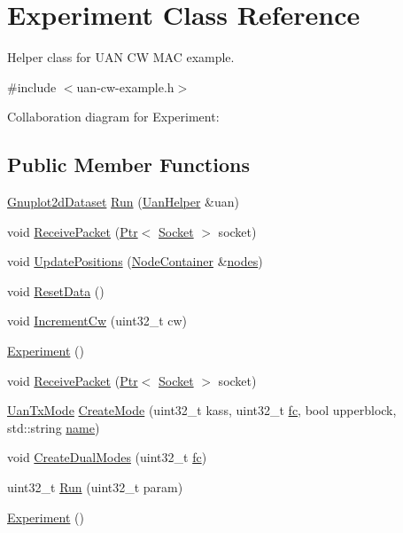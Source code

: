 \hypertarget{classExperiment}{}\section{Experiment Class Reference}
\label{classExperiment}


Helper class for U\+AN CW M\+AC example.  




{\ttfamily \#include $<$uan-\/cw-\/example.\+h$>$}



Collaboration diagram for Experiment\+:
\subsection*{Public Member Functions}
\begin{DoxyCompactItemize}
\item 
\hyperlink{classns3_1_1Gnuplot2dDataset}{Gnuplot2d\+Dataset} \hyperlink{classExperiment_a2e7dad008a78e106fdbde1917d0bca1b}{Run} (\hyperlink{classns3_1_1UanHelper}{Uan\+Helper} \&uan)
\item 
void \hyperlink{classExperiment_a71b89b6aeef271abd148ac8c9dc246d4}{Receive\+Packet} (\hyperlink{classns3_1_1Ptr}{Ptr}$<$ \hyperlink{classns3_1_1Socket}{Socket} $>$ socket)
\item 
void \hyperlink{classExperiment_a235b38a9d7884a3381c1da4cc5c794ca}{Update\+Positions} (\hyperlink{classns3_1_1NodeContainer}{Node\+Container} \&\hyperlink{visualizer-ideas_8txt_a3e1b3808014a2c68ab0cd0182e041be2}{nodes})
\item 
void \hyperlink{classExperiment_a587b704eb6e44c0f573005464f1dc880}{Reset\+Data} ()
\item 
void \hyperlink{classExperiment_ab252998a0101be7d45e2c766eb0e2c85}{Increment\+Cw} (uint32\+\_\+t cw)
\item 
\hyperlink{classExperiment_a303e6a05d99f403ff4793495a2fbff58}{Experiment} ()
\item 
void \hyperlink{classExperiment_a71b89b6aeef271abd148ac8c9dc246d4}{Receive\+Packet} (\hyperlink{classns3_1_1Ptr}{Ptr}$<$ \hyperlink{classns3_1_1Socket}{Socket} $>$ socket)
\item 
\hyperlink{classns3_1_1UanTxMode}{Uan\+Tx\+Mode} \hyperlink{classExperiment_ab8bb79b9db7cb7c69fc58db64d162c1b}{Create\+Mode} (uint32\+\_\+t kass, uint32\+\_\+t \hyperlink{lte__uplink__power__control_8m_a72d54db2b27ce046aab6e6a414c407e9}{fc}, bool upperblock, std\+::string \hyperlink{generate__test__data__lte__spectrum__model_8m_ab74e6bf80237ddc4109968cedc58c151}{name})
\item 
void \hyperlink{classExperiment_ab5cf12c658d459b5d2004c2b432d0e83}{Create\+Dual\+Modes} (uint32\+\_\+t \hyperlink{lte__uplink__power__control_8m_a72d54db2b27ce046aab6e6a414c407e9}{fc})
\item 
uint32\+\_\+t \hyperlink{classExperiment_af6dfe488630fe9cb82dc290d84846f82}{Run} (uint32\+\_\+t param)
\item 
\hyperlink{classExperiment_a303e6a05d99f403ff4793495a2fbff58}{Experiment} ()
\end{DoxyCompactItemize}
